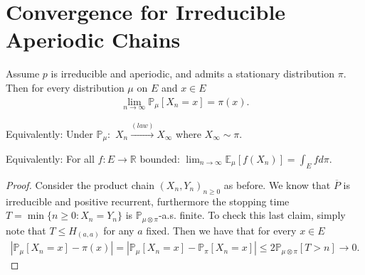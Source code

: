 \section{Convergence for Irreducible Aperiodic Chains}
\begin{theorem}[]
	Assume $p$ is irreducible and aperiodic, and admits a stationary distribution $\pi $. Then for every distribution $\mu$ on $E$ and $x \in E$  
	\begin{align}
\boxed{	\lim_{n \to \infty}\mathbb{P}_{\mu } \left[ X_n=x \right] = \pi(x)}
	.\end{align}
	

	\noindent
	Equivalently: Under $\mathbb{P}_\mu: $ $X_n \stackrel{(law)}{\to} X_\infty$ where $X_\infty \sim \pi$. 

	\noindent
	Equivalently: For all $f:E\to \mathbb{R}$ bounded: $\lim_{n \to \infty} \mathbb{E}_{\mu } \left[ f(X_n) \right] = \int_{E}^{} f d \pi$.
\end{theorem}
\begin{proof}
	Consider the product chain $(X_n, Y_n)_{n\geq 0}$ as before. We know that $\overline{P}$ is irreducible and positive recurrent, furthermore the stopping time $T=\min\{n\geq 0: X_n = Y_n\}$ is $\mathbb{P}_{\mu \otimes \pi }$-a.s. finite. To check this last claim, simply note that $T \leq H_{(a,a)}$ for any $a$ fixed. Then we have that for every $x \in E$ 
\begin{align}
	\left| \mathbb{P}_{\mu } \left[ X_n = x \right] - \pi(x) \right| = \left|\mathbb{P}_{\mu } \left[ X_n = x \right] - \mathbb{P}_{\pi } \left[ X_n = x \right] \right| \leq 2 \mathbb{P}_{\mu \otimes \pi } \left[ T >n \right] \to 0 
	.\end{align}
\end{proof}


